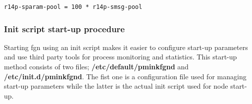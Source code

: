 \documentclass[a4paper,latin]{paper}
\begin{document}
\begin{lstlisting}[style=BashInputStyle, belowskip=\baselineskip]
r14p-sparam-pool = 100 * r14p-smsg-pool
\end{lstlisting}

\subsubsection{Init script start-up procedure}
Starting \acrfull{fgn} using an init script makes it easier to configure start-up parameters and use third party tools for process
monitoring and statistics. This  start-up method consists of two files; 
\textbf{/etc/default/pmink\textunderscore{}fgnd} and \textbf{/etc/init.d/pmink\textunderscore{}fgnd}. The fist one is a configuration file
used for managing start-up parameters while the latter is the actual init script used for node start-up.\\
\end{document}
